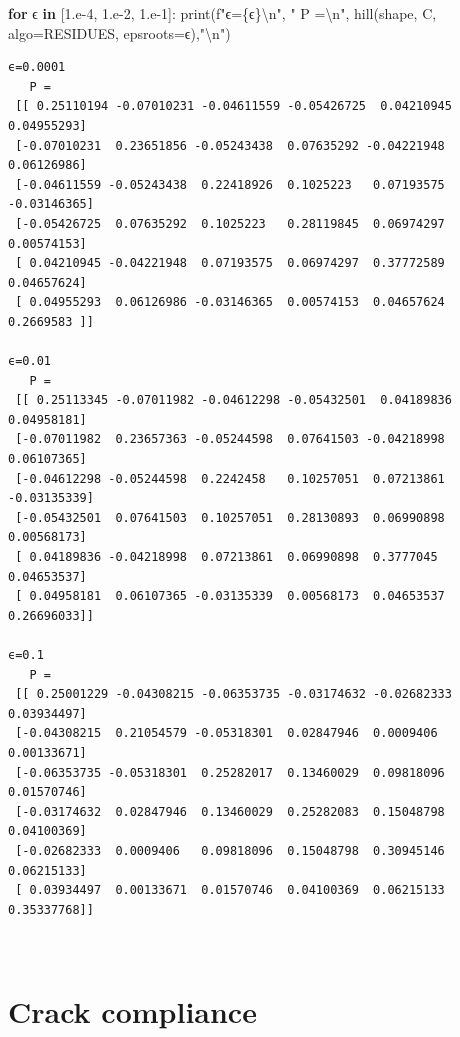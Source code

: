 \documentclass[
  letterpaper,
  DIV=11,
  numbers=noendperiod]{scrreprt}
\newenvironment{Shaded}{\begin{snugshade}}{\end{snugshade}}
\newcommand{\BuiltInTok}[1]{\textcolor[rgb]{0.00,0.23,0.31}{#1}}
\newcommand{\CharTok}[1]{\textcolor[rgb]{0.13,0.47,0.30}{#1}}
\newcommand{\ControlFlowTok}[1]{\textcolor[rgb]{0.00,0.23,0.31}{\textbf{#1}}}
\newcommand{\FloatTok}[1]{\textcolor[rgb]{0.68,0.00,0.00}{#1}}
\newcommand{\KeywordTok}[1]{\textcolor[rgb]{0.00,0.23,0.31}{\textbf{#1}}}
\newcommand{\NormalTok}[1]{\textcolor[rgb]{0.00,0.23,0.31}{#1}}
\newcommand{\OperatorTok}[1]{\textcolor[rgb]{0.37,0.37,0.37}{#1}}
\newcommand{\SpecialCharTok}[1]{\textcolor[rgb]{0.37,0.37,0.37}{#1}}
\newcommand{\SpecialStringTok}[1]{\textcolor[rgb]{0.13,0.47,0.30}{#1}}
\newcommand{\StringTok}[1]{\textcolor[rgb]{0.13,0.47,0.30}{#1}}
\begin{document}
\begin{Shaded}
\begin{Highlighting}[]
\ControlFlowTok{for}\NormalTok{ ϵ }\KeywordTok{in}\NormalTok{ [}\FloatTok{1.e{-}4}\NormalTok{, }\FloatTok{1.e{-}2}\NormalTok{, }\FloatTok{1.e{-}1}\NormalTok{]:}
    \BuiltInTok{print}\NormalTok{(}\SpecialStringTok{f"ϵ=}\SpecialCharTok{\{ϵ\}}\CharTok{\textbackslash{}n}\SpecialStringTok{"}\NormalTok{, }\StringTok{"  P =}\CharTok{\textbackslash{}n}\StringTok{"}\NormalTok{, hill(shape, C, algo}\OperatorTok{=}\NormalTok{RESIDUES, epsroots}\OperatorTok{=}\NormalTok{ϵ),}\StringTok{"}\CharTok{\textbackslash{}n}\StringTok{"}\NormalTok{)}
\end{Highlighting}
\end{Shaded}

\begin{verbatim}
ϵ=0.0001
   P =
 [[ 0.25110194 -0.07010231 -0.04611559 -0.05426725  0.04210945  0.04955293]
 [-0.07010231  0.23651856 -0.05243438  0.07635292 -0.04221948  0.06126986]
 [-0.04611559 -0.05243438  0.22418926  0.1025223   0.07193575 -0.03146365]
 [-0.05426725  0.07635292  0.1025223   0.28119845  0.06974297  0.00574153]
 [ 0.04210945 -0.04221948  0.07193575  0.06974297  0.37772589  0.04657624]
 [ 0.04955293  0.06126986 -0.03146365  0.00574153  0.04657624  0.2669583 ]] 

ϵ=0.01
   P =
 [[ 0.25113345 -0.07011982 -0.04612298 -0.05432501  0.04189836  0.04958181]
 [-0.07011982  0.23657363 -0.05244598  0.07641503 -0.04218998  0.06107365]
 [-0.04612298 -0.05244598  0.2242458   0.10257051  0.07213861 -0.03135339]
 [-0.05432501  0.07641503  0.10257051  0.28130893  0.06990898  0.00568173]
 [ 0.04189836 -0.04218998  0.07213861  0.06990898  0.3777045   0.04653537]
 [ 0.04958181  0.06107365 -0.03135339  0.00568173  0.04653537  0.26696033]] 

ϵ=0.1
   P =
 [[ 0.25001229 -0.04308215 -0.06353735 -0.03174632 -0.02682333  0.03934497]
 [-0.04308215  0.21054579 -0.05318301  0.02847946  0.0009406   0.00133671]
 [-0.06353735 -0.05318301  0.25282017  0.13460029  0.09818096  0.01570746]
 [-0.03174632  0.02847946  0.13460029  0.25282083  0.15048798  0.04100369]
 [-0.02682333  0.0009406   0.09818096  0.15048798  0.30945146  0.06215133]
 [ 0.03934497  0.00133671  0.01570746  0.04100369  0.06215133  0.35337768]] 
\end{verbatim}

\(\,\)

\chapter{Crack compliance}\label{sec-crack_compliance}
\end{document}
